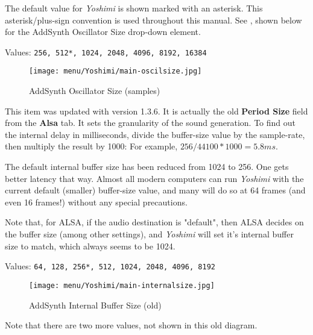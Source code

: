 %

   The default value for \textsl{Yoshimi} is shown marked with an asterisk.
   This asterisk/plus-sign convention is used throughout this manual.
   See ,
   shown below for the AddSynth Oscillator Size drop-down element.

   Values: \texttt{256, 512*, 1024, 2048, 4096, 8192, 16384}

\begin{figure}[H]
   \centering
   \texttt{[image: menu/Yoshimi/main-oscilsize.jpg]}
   \caption[OscilSize Values]{AddSynth Oscillator Size (samples)}
   \label{fig:yoshimi_oscilsize_values}
\end{figure}

   This item was updated with version 1.3.6.  It is actually the old
   \textbf{Period Size} field from the \textbf{Alsa} tab.
   It sets the granularity of the sound generation.
   To find out the internal delay in milliseconds, divide the
   buffer-size value by the sample-rate, then multiply the result by 1000:
   For example, \(256 / 44100 * 1000 = 5.8 ms\).

   The default internal buffer size has been reduced from 1024 to 256.  One
   gets better latency that way.  Almost all modern computers can run
   \textsl{Yoshimi} with the current default (smaller) buffer-size value, and
   many will do so at 64 frames (and even 16 frames!)
   without any special precautions.

   Note that, for ALSA, if the audio destination is "default",
   then ALSA decides on the buffer size (among other settings), and
   \textsl{Yoshimi} will set it's internal buffer size to match,
   which always seems to be 1024.

   Values: \texttt{64, 128, 256*, 512, 1024, 2048, 4096, 8192}

\begin{figure}[H]
   \centering
   \texttt{[image: menu/Yoshimi/main-internalsize.jpg]}
   \caption[Internal Size Values]{AddSynth Internal Buffer Size (old)}
   \label{fig:yoshimi_internalsize_values}
\end{figure}

   Note that there are two more values, not shown in this old diagram.

